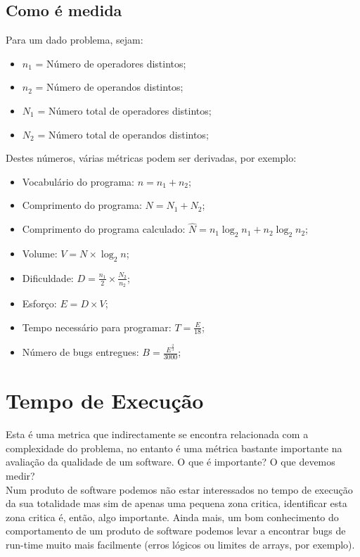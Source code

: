 \documentclass[a4paper,10pt,openright,openbib,twocolumn]{article}
\begin{document}
\subsection{Como é medida}
Para um dado problema, sejam:
\begin{itemize}
	\item $n_1$ = Número de operadores distintos;
	\item $n_2$ = Número de operandos distintos;
	\item $N_1$ = Número total de operadores distintos;
	\item $N_2$ = Número total de operandos distintos;
\end{itemize}
Destes números, várias métricas podem ser derivadas, por exemplo:
\begin{itemize}
	\item Vocabulário do programa: $n = n_1 + n_2$;
	\item Comprimento do programa: $N = N_1 + N_2$;
	\item Comprimento do programa calculado: $\widehat{N} = n_1 \log_2{n_1} + n_2 \log_2{n_2}$;
	\item Volume: $V = N \times \log_2{n}$;
	\item Dificuldade: $D = \frac{n_1}{2} \times \frac{N_2}{n_2}$;
	\item Esforço: $E = D \times V$;
	\item Tempo necessário para programar: $T = \frac{E}{18}$;
	\item Número de bugs entregues: $B = \frac{E^{\frac{2}{3}}}{3000}$;
\end{itemize}

\section{Tempo de Execução}
Esta é uma metrica que indirectamente se encontra relacionada com a complexidade do problema, no entanto é uma métrica bastante importante na avaliação da qualidade de um software. O que é importante? O que devemos medir? \\
Num produto de software podemos não estar interessados no tempo de execução da sua totalidade mas sim de apenas uma pequena zona critica, identificar esta zona critica é, então, algo importante. Ainda mais, um bom conhecimento do comportamento de um produto de software podemos levar a encontrar bugs de run-time muito mais facilmente (erros lógicos ou limites de arrays, por exemplo). 
\end{document}
